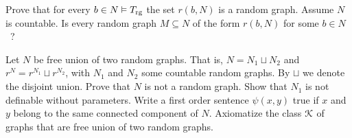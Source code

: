 \documentclass[creche.tex]{subfiles}
\begin{document}
\begin{exercise}
Prove that for every $b\in N\models T_{\rm rg}$ the set $r(b,N)$ is a random graph. Assume $N$ is countable. Is every random  graph $M\subseteq N$ of the form $r(b,N)$ for some $b\in N$~?\QED
\end{exercise}


\begin{exercise}\label{unionedisgiunta}
Let $N$ be free union of two random graphs. That is, $N=N_1\sqcup N_2$ and $r^N= r^{N_1}\sqcup r^{N_2}$, with $N_1$ and $N_2$ some countable random graphs. By $\sqcup$ we denote the disjoint union. Prove that $N$ is not a random graph. Show that $N_1$ is not definable without parameters. Write a first order sentence $\psi(x,y)$ true if $x$ and $y$ belong to the same connected component of $N$. Axiomatize the class $\K$ of graphs that are free union of two random graphs.\QED
\end{exercise}

%
%
\end{document}
